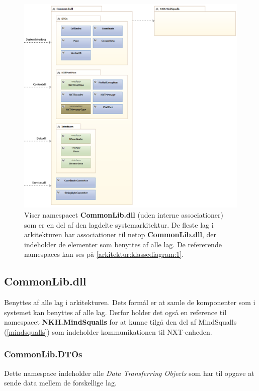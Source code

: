 \begin{figure}
\centering
\includegraphics[width=1\textwidth]{./graphics/systemarkitektur_2}
\caption{Viser namespacet \textbf{CommonLib.dll} (uden interne associationer) som er en del af den lagdelte systemarkitektur. De fleste lag i arkitekturen har associationer til netop \textbf{CommonLib.dll}, der indeholder de elementer som benyttes af alle lag. De refererende namespaces kan ses på \cref{arkitektur:klassediagram:1}.}
\label{arkitektur:klassediagram:2}
\end{figure}

\subsection{CommonLib.dll}\label{arkitektur:commonlib}
Benyttes af alle lag i arkitekturen.
Dets formål er at samle de komponenter som i systemet kan benyttes af alle lag.
Derfor holder det også en reference til namespacet \textbf{NKH.MindSqualls} for at kunne tilgå den del af MindSqualls (\cref{mindsqualls}) som indeholder kommunikationen til NXT-enheden.

\subsubsection{CommonLib.DTOs}
Dette namespace indeholder alle \textit{Data Transferring Objects} som har til opgave at sende data mellem de forskellige lag.

